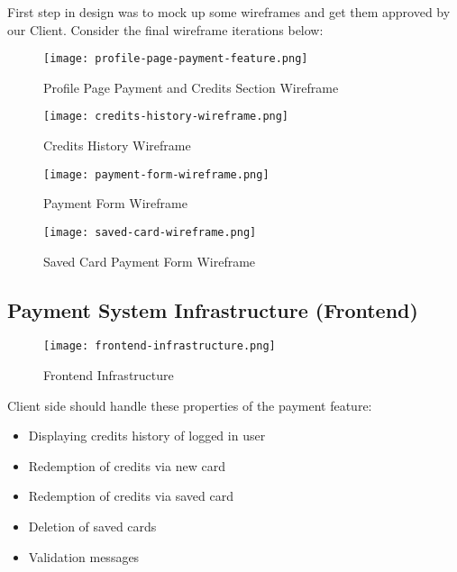 First step in design was to mock up some wireframes and get them approved by our Client. Consider the final wireframe iterations below:\\

\begin{figure}[!hbt]
  	\centering
 	\texttt{[image: profile-page-payment-feature.png]}
  	\caption{Profile Page Payment and Credits Section Wireframe}
 	\label{fig:profile-wireframe}
\end{figure}

\begin{figure}[!hbt]
  	\centering
 	\texttt{[image: credits-history-wireframe.png]}
  	\caption{Credits History Wireframe}
 	\label{fig:credits-history-wireframe}
\end{figure}

\begin{figure}[!hbt]
  	\centering
 	\texttt{[image: payment-form-wireframe.png]}
  	\caption{Payment Form Wireframe}
 	\label{fig:payment-form-wireframe}
\end{figure}

\begin{figure}[!hbt]
  	\centering
 	\texttt{[image: saved-card-wireframe.png]}
  	\caption{Saved Card Payment Form Wireframe}
 	\label{fig:saved-card-wireframe}
\end{figure}

\subsection{Payment System Infrastructure (Frontend)}
\label{subsec:payment-system-infrastructure}

\begin{figure}[!hbt]
  	\centering
 	\texttt{[image: frontend-infrastructure.png]}
  	\caption{Frontend Infrastructure}
 	\label{fig:frontend-infrastructure-diagram}
\end{figure}

Client side should handle these properties of the payment feature:

\begin{itemize}
\item Displaying credits history of logged in user
\item Redemption of credits via new card
\item Redemption of credits via saved card
\item Deletion of saved cards
\item Validation messages
\end{itemize}

